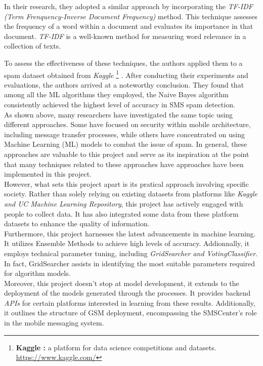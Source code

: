 \documentclass[12pt,a4paper]{report}
\begin{document}
	In their research, they adopted a similar approach by incorporating the \textit{TF-IDF (Term Frenquency-Inverse Document Frequency)} method. This technique assesses the frequency of a word within a document and evaluates its importance in that document. \textit{TF-IDF} is a well-known method for measuring word relevance in a collection of texts.
	
	To assess the effectiveness of these techniques, the authors applied them to a spam dataset obtained from \textit{Kaggle} 
	\footnote{ \textbf{Kaggle :} a platform for data science competitions and datasets. \url{https://www.kaggle.com/}}
	. After conducting their experiments and evaluations, the authors arrived at a noteworthy conclusion. They found that among all the ML algorithms they employed, the Naive Bayes algorithm consistently achieved the highest level of accuracy in SMS spam detection.\\
	
	As shown above, many researchers have investigated the same topic using different approaches. Some have focused on security within mobile architecture, including message transfer processes, while others have concentrated on using Machine Learning (ML) models to combat the issue of spam. In general, these approaches are valuable to this project and serve as its inspiration at the point that many techniques related to these approaches have approaches have been implemented in this project.\\

    However, what sets this project apart is its pratical approach involving specific society. Rather than solely relying on existing datasets from platforms like \textit{Kaggle and UC Machine Learning Repository}, this project has actively engaged with people to collect data. It has also integrated some data from these platform datasets to enhance the quality of information. \\
        
    Furthermore, this project harnesses the latest advancements in machine learning. It utilizes Ensemble Methods to achieve high levels of accuracy. Addionnally, it employs technical parameter tuning, including \textit{GridSearcher and VotingClassifier}. In fact, GridSearcher assists in identifying the most suitable parameters required for algorithm models.  
    \\
    
    Moreover, this project doesn't stop at model development, it extends to the deployment of the models generated through the processes. It provides backend \textit{APIs} for certain platforms interested in learning from these results. Additionally, it outlines the structure of GSM deployment, encompassing the SMSCenter's role in the mobile messaging system.
   
\end{document}
